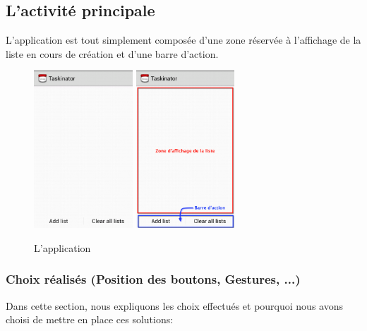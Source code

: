 \documentclass[a4paper,10pt]{article}
\begin{document}
\subsection{L'activité principale}
L'application est tout simplement composée d'une zone réservée à l'affichage de la liste en cours de création et d'une barre d'action.
\begin{figure}[H]
    \center
    \includegraphics[width=3.7cm]{Images/mainActivity.png}\quad
    \includegraphics[width=3.7cm]{Images/mainActivityPart.png}
    \caption{L'application}
\end{figure}

\subsubsection{Choix réalisés (Position des boutons, Gestures, ...)}
Dans cette section, nous expliquons les choix effectués et pourquoi nous avons choisi de mettre en place ces solutions:
\end{document}
